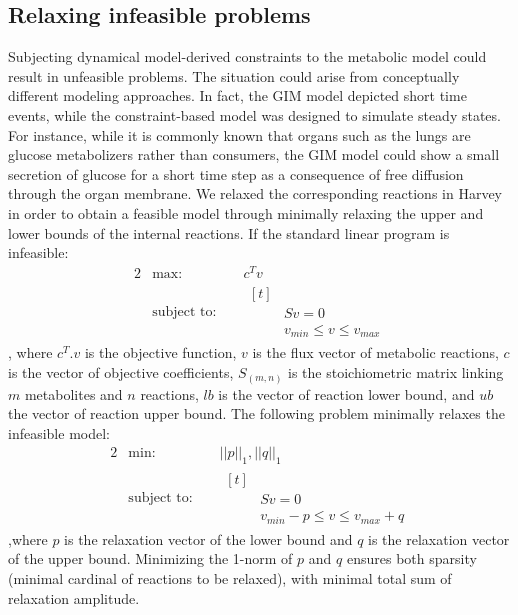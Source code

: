 \subsection{Relaxing infeasible problems} \label{GIM:sp2}
Subjecting dynamical model-derived constraints to the metabolic model could result in unfeasible problems. The situation could arise from conceptually different modeling approaches. In fact, the GIM model depicted short time events, while the constraint-based model was designed to simulate steady states. For instance, while it is commonly known that organs such as the lungs are glucose metabolizers rather than consumers, the GIM model could show a small secretion of glucose for a short time step as a consequence of free diffusion through the organ membrane. We relaxed the corresponding reactions in Harvey in order to obtain a feasible model through minimally relaxing the upper and lower bounds of the internal reactions. If the standard linear program is infeasible:\\
\begin{alignat*}{2} 
  & \text{max: } &  & c^{T}v\\
  & \text{subject to: } &  &  
                \begin{aligned}[t] \\
                & Sv=0 \\
                & v_{min} \leq v  \leq  v_{max}
                \end{aligned}
\end{alignat*}
, where $c^{T}.v$ is the objective function, $v$ is the flux vector of metabolic reactions, $c$ is the vector of objective coefficients, $S_{(m,n)}$ is the stoichiometric matrix linking $m$ metabolites and $n$ reactions, $lb$ is the vector of reaction lower bound, and $ub$ the vector of reaction upper bound. The following problem minimally relaxes the infeasible model:
\begin{alignat*}{2} 
  & \text{min: } &  & ||p||_{1},||q||_{1}\\
  & \text{subject to: } &  &  
                \begin{aligned}[t] \\
                & Sv=0 \\
                & v_{min} - p \leq v  \leq  v_{max} + q
                \end{aligned}
\end{alignat*}
,where $p$ is the relaxation vector of the lower bound and $q$ is the relaxation vector of the upper bound. Minimizing the 1-norm of $p$ and $q$ ensures both sparsity (minimal cardinal of reactions to be relaxed), with minimal total sum of relaxation amplitude.
